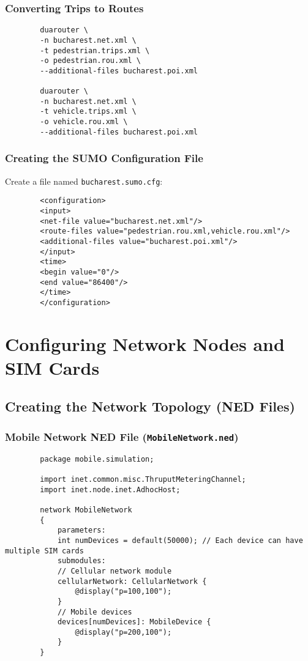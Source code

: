 \documentclass{article}
\begin{document}
	\subsubsection{Converting Trips to Routes}
	
	\begin{verbatim}
		duarouter \
		-n bucharest.net.xml \
		-t pedestrian.trips.xml \
		-o pedestrian.rou.xml \
		--additional-files bucharest.poi.xml
		
		duarouter \
		-n bucharest.net.xml \
		-t vehicle.trips.xml \
		-o vehicle.rou.xml \
		--additional-files bucharest.poi.xml
	\end{verbatim}
	
	\subsubsection{Creating the SUMO Configuration File}
	
	Create a file named \texttt{bucharest.sumo.cfg}:
	
	\begin{verbatim}
		<configuration>
		<input>
		<net-file value="bucharest.net.xml"/>
		<route-files value="pedestrian.rou.xml,vehicle.rou.xml"/>
		<additional-files value="bucharest.poi.xml"/>
		</input>
		<time>
		<begin value="0"/>
		<end value="86400"/>
		</time>
		</configuration>
	\end{verbatim}
	
	\section{Configuring Network Nodes and SIM Cards}
	
	\subsection{Creating the Network Topology (NED Files)}
	
	\subsubsection{Mobile Network NED File (\texttt{MobileNetwork.ned})}
	
	\begin{verbatim}
		package mobile.simulation;
		
		import inet.common.misc.ThruputMeteringChannel;
		import inet.node.inet.AdhocHost;
		
		network MobileNetwork
		{
			parameters:
			int numDevices = default(50000); // Each device can have multiple SIM cards
			submodules:
			// Cellular network module
			cellularNetwork: CellularNetwork {
				@display("p=100,100");
			}
			// Mobile devices
			devices[numDevices]: MobileDevice {
				@display("p=200,100");
			}
		}
	\end{verbatim}
	
\end{document}
